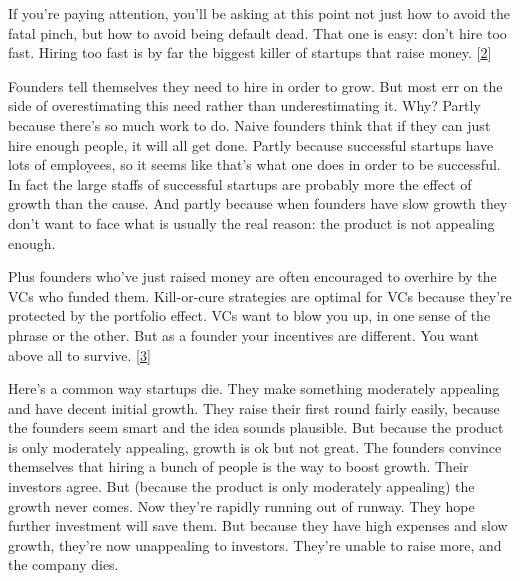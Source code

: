 If you're paying
                  attention, you'll be asking at this point not just how to
                  avoid the fatal pinch, but how to avoid being default dead.
                  That one is easy: don't hire too fast. Hiring too fast is by
                  far the biggest killer of startups that raise money.
                  [\href{\#f2n}{2}]

Founders tell themselves they need to hire in
                  order to grow. But most err on the side of overestimating this
                  need rather than underestimating it. Why? Partly because
                  there's so much work to do. Naive founders think that if they
                  can just hire enough people, it will all get done. Partly
                  because successful startups have lots of employees, so it
                  seems like that's what one does in order to be successful. In
                  fact the large staffs of successful startups are probably more
                  the effect of growth than the cause. And partly because when
                  founders have slow growth they don't want to face what is
                  usually the real reason: the product is not appealing
                  enough.

Plus founders who've just raised money are
                  often encouraged to overhire by the VCs who funded them.
                  Kill-or-cure strategies are optimal for VCs because they're
                  protected by the portfolio effect. VCs want to blow you up, in
                  one sense of the phrase or the other. But as a founder your
                  incentives are different. You want above all to survive.
                  [\href{\#f3n}{3}]

Here's a common way startups die. They make
                  something moderately appealing and have decent initial growth.
                  They raise their first round fairly easily, because the
                  founders seem smart and the idea sounds plausible. But because
                  the product is only moderately appealing, growth is ok but not
                  great. The founders convince themselves that hiring a bunch of
                  people is the way to boost growth. Their investors agree. But
                  (because the product is only moderately appealing) the growth
                  never comes. Now they're rapidly running out of runway. They
                  hope further investment will save them. But because they have
                  high expenses and slow growth, they're now unappealing to
                  investors. They're unable to raise more, and the company
                  dies.

